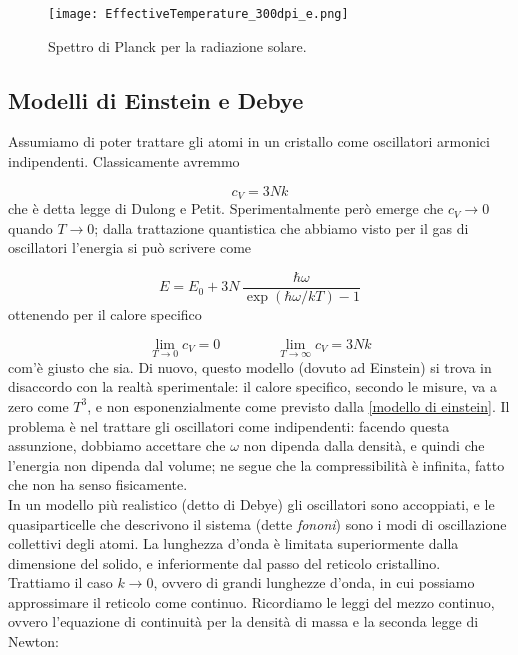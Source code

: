 \documentclass[a4paper]{report}
\begin{document}
\begin{figure}[h]
    \centering
    \texttt{[image: EffectiveTemperature\_300dpi\_e.png]}
    \caption{Spettro di Planck per la radiazione solare.}
\end{figure}

\subsection{Modelli di Einstein e Debye}

Assumiamo di poter trattare gli atomi in un cristallo come oscillatori armonici indipendenti. Classicamente avremmo 

\begin{equation}
    c_V = 3 N k
\end{equation}
che è detta legge di Dulong e Petit. Sperimentalmente però emerge che $c_V \to 0$ quando $T \to 0$; dalla trattazione quantistica che abbiamo visto per il gas di oscillatori l'energia si può scrivere come

\begin{equation}
    E = E_0 + 3N\,\frac{\hbar\omega}{\exp(\hbar\omega/k T)-1}
    \label{modello di einstein}
\end{equation}
ottenendo per il calore specifico

\begin{equation}
    \lim_{T\to 0} c_V = 0 \qquad\qquad \lim_{T\to \infty} c_V = 3 N k
\end{equation}
com'è giusto che sia. Di nuovo, questo modello (dovuto ad Einstein) si trova in disaccordo con la realtà sperimentale: il calore specifico, secondo le misure, va a zero come $T^3$, e non esponenzialmente come previsto dalla \eqref{modello di einstein}. Il problema è nel trattare gli oscillatori come indipendenti: facendo questa assunzione, dobbiamo accettare che $\omega$ non dipenda dalla densità, e quindi che l'energia non dipenda dal volume; ne segue che la compressibilità è infinita, fatto che non ha senso fisicamente. \\
In un modello più realistico (detto di Debye) gli oscillatori sono accoppiati, e le quasiparticelle che descrivono il sistema (dette \textit{fononi}) sono i modi di oscillazione collettivi degli atomi. La lunghezza d'onda è limitata superiormente dalla dimensione del solido, e inferiormente dal passo del reticolo cristallino. \\
Trattiamo il caso $k\to 0$, ovvero di grandi lunghezze d'onda, in cui possiamo approssimare il reticolo come continuo. Ricordiamo le leggi del mezzo continuo, ovvero l'equazione di continuità per la densità di massa e la seconda legge di Newton:
\end{document}
